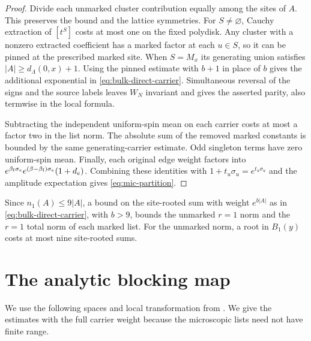\documentclass[11pt]{article}
\theoremstyle{definition}
\begin{document}
\begin{proof}
Divide each unmarked cluster contribution equally among the sites
of \(A\). This preserves the bound and the lattice symmetries.
For \(S\ne\varnothing\), Cauchy extraction of \([t^S]\) costs at most
one on the fixed polydisk. Any cluster with a nonzero extracted
coefficient has a marked factor at each \(u\in S\), so it can be
pinned at the prescribed marked site. When \(S=M_x\) its generating
union satisfies \(|A|\ge d_\Lambda(0,x)+1\). Using the pinned
estimate with \(b+1\) in place of \(b\) gives the additional
exponential in \eqref{eq:bulk-direct-carrier}. Simultaneous reversal
of the signs and the source labels leaves \(W_N\) invariant and
gives the asserted parity, also termwise in the local formula.

Subtracting the independent uniform-spin mean on each carrier costs
at most a factor two in the list norm. The absolute sum of the
removed marked constants is bounded by the same generating-carrier
estimate. Odd singleton terms have zero uniform-spin mean. Finally,
each original edge weight factors into
\(e^{\beta_{\rm I}\sigma_e}e^{(\beta-\beta_{\rm I})\sigma_e}(1+d_e)\).
Combining these identities with \(1+t_u\sigma_u=e^{t_u\sigma_u}\)
and the amplitude expectation gives \eqref{eq:mic-partition}.
\end{proof}

Since \(n_1(A)\le9|A|\), a bound on the site-rooted sum with weight
\(e^{b|A|}\) as in \eqref{eq:bulk-direct-carrier}, with \(b>9\),
bounds the unmarked \(r=1\) norm and the \(r=1\) total norm of
each marked list. For the unmarked norm, a root in \(B_1(y)\)
costs at most nine site-rooted sums.

\section{The analytic blocking map}
\label{sec:blocking}

We use the following spaces and local transformation from
\cite[Sections 5.1--5.2]{BulkIsingRadialRG}. We give the
estimates with the full carrier weight because the microscopic
lists need not have finite range.
\end{document}
